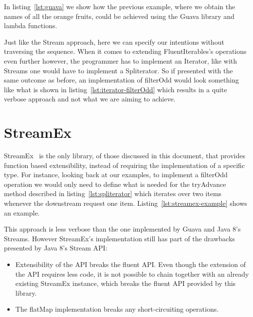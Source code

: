 In listing~\ref{lst:guava} we show how the previous example, where we obtain the names of all the orange fruits, could be achieved using the Guava library and lambda functions.



Just like the Stream approach, here we can specify our intentions without traversing the sequence. When it comes to extending FluentIterables's operations even further however, the programmer has to implement an Iterator, like with Streams one would have to implement a Spliterator. So if presented with the same outcome as before, an implementation of filterOdd would look something like what is shown in listing~\ref{lst:iterator-filterOdd} which results in a quite verbose approach and not what we are aiming to achieve.



\section{StreamEx}

StreamEx~\citep{streamex} is the only library, of those discussed in this document, that provides function based extensibility, instead of requiring the implementation of a specific type. For instance, looking back at our examples, to implement a filterOdd operation we would only need to define what is needed for the tryAdvance method described in listing~\ref{lst:spliterator} which iterates over two items whenever the downstream request one item. Listing~\ref{lst:streamex-example} shows an example.



This approach is less verbose than the one implemented by Guava and Java 8's Streams. However StreamEx's implementation still has part of the drawbacks presented by Java 8's Stream API:
\begin{itemize}
\item Extensibility of the API breaks the fluent API.
Even though the extension of the API requires less code, it is not possible to chain together with an already existing StreamEx instance, which breaks the fluent API provided by this library.
\item The flatMap implementation breaks any short-circuiting operations.
\end{itemize}



